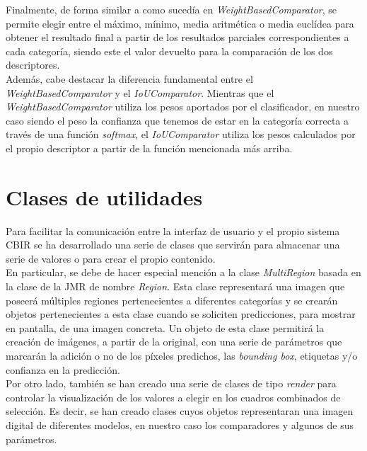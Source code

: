 Finalmente, de forma similar a como sucedía en \emph{WeightBasedComparator}, se permite elegir entre el máximo, mínimo, media aritmética o media euclídea para obtener el resultado final a partir de los resultados parciales correspondientes a cada categoría, siendo este el valor devuelto para la comparación de los dos descriptores.\\

Además, cabe destacar la diferencia fundamental entre el \emph{WeightBasedComparator} y el \emph{IoUComparator}. Mientras que el \emph{WeightBasedComparator} utiliza los pesos aportados por el clasificador, en nuestro caso siendo el peso la confianza que tenemos de estar en la categoría correcta a través de una función \emph{softmax}, el \emph{IoUComparator} utiliza los pesos calculados por el propio descriptor a partir de la función mencionada más arriba.\\


\section{Clases de utilidades}
Para facilitar la comunicación entre la interfaz de usuario y el propio sistema CBIR se ha desarrollado una serie de clases que servirán para almacenar una serie de valores o para crear el propio contenido.\\

En particular, se debe de hacer especial mención a la clase \emph{MultiRegion} basada en la clase de la JMR \cite{JMR} de nombre \emph{Region}. Esta clase representará una imagen que poseerá múltiples regiones pertenecientes a diferentes categorías y se crearán objetos pertenecientes a esta clase cuando se soliciten predicciones, para mostrar en pantalla, de una imagen concreta. Un objeto de esta clase permitirá la creación de imágenes, a partir de la original, con una serie de parámetros que marcarán la adición o no de los píxeles predichos, las \emph{bounding box}, etiquetas y/o confianza en la predicción.\\

Por otro lado, también se han creado una serie de clases de tipo \emph{render} para controlar la visualización de los valores a elegir en los cuadros combinados de selección. Es decir, se han creado clases cuyos objetos representaran una imagen digital de diferentes modelos, en nuestro caso los comparadores y algunos de sus parámetros.\\

